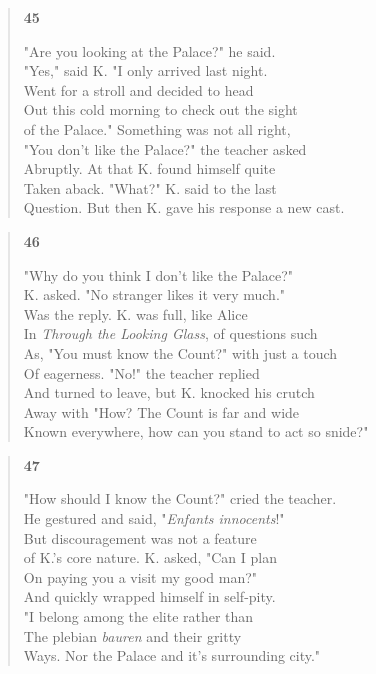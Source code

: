 \documentclass{article}
\begin{document}
\begin{verse}
  \begin{center}
    \textbf{45} \\
  \end{center}
  "Are you looking at the Palace?" he said. \\
  "Yes," said K. "I only arrived last night. \\
  Went for a stroll and decided to head \\
  Out this cold morning to check out the sight \\
  of the Palace." Something was not all right, \\
  "You don't like the Palace?" the teacher asked \\
  Abruptly. At that K. found himself quite \\
  Taken aback. "What?" K. said to the last \\
  Question. But then K. gave his response a new cast.
\end{verse}
\begin{verse}
  \begin{center}
    \textbf{46} \\
  \end{center}
  "Why do you think I don't like the Palace?" \\
  K. asked. "No stranger likes it very much." \\
  Was the reply. K. was full, like Alice \\
  In \textit{Through the Looking Glass}, of questions such \\
  As, "You must know the Count?" with just a touch \\
  Of eagerness. "No!" the teacher replied \\
  And turned to leave, but K. knocked his crutch \\
  Away with "How? The Count is far and wide \\
  Known everywhere, how can you stand to act so snide?"
\end{verse}
\begin{verse}
  \begin{center}
    \textbf{47} \\
  \end{center}
  "How should I know the Count?" cried the teacher. \\
  He gestured and said, "\textit{Enfants innocents}!" \\
  But discouragement was not a feature \\
  of K.'s core nature. K. asked, "Can I plan \\
  On paying you a visit my good man?" \\
  And quickly wrapped himself in self-pity. \\
  "I belong among the elite rather than \\
  The plebian \textit{bauren} and their gritty \\
  Ways. Nor the Palace and it's surrounding city."
\end{verse}
\end{document}
